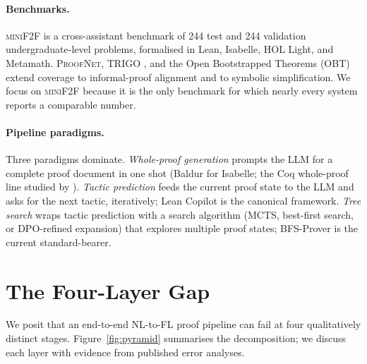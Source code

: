 \documentclass[11pt,letterpaper]{article}
\begin{document}
\paragraph{Benchmarks.}
\textsc{miniF2F} is a cross-assistant benchmark of 244 test and 244
validation undergraduate-level problems, formalised in Lean,
Isabelle, HOL Light, and Metamath. \textsc{ProofNet}, \textsc{TRIGO}
\cite{xiong2023trigo}, and the Open Bootstrapped Theorems (OBT)
\cite{wang2024theoremllama} extend coverage to informal-proof
alignment and to symbolic simplification. We focus on \textsc{miniF2F}
because it is the only benchmark for which nearly every system reports
a comparable number.

\paragraph{Pipeline paradigms.}
Three paradigms dominate. \emph{Whole-proof generation} prompts the
LLM for a complete proof document in one shot (Baldur for Isabelle;
the Coq whole-proof line studied by \cite{prasad2024coq}).
\emph{Tactic prediction} feeds the current proof state to the LLM and
asks for the next tactic, iteratively; Lean Copilot
\cite{song2024leancopilot} is the canonical framework. \emph{Tree
search} wraps tactic prediction with a search algorithm (MCTS,
best-first search, or DPO-refined expansion) that explores multiple
proof states; BFS-Prover \cite{xin2025bfsprover} is the current
standard-bearer.

\section{The Four-Layer Gap}
\label{sec:layers}

We posit that an end-to-end NL-to-FL proof pipeline can fail at four
qualitatively distinct stages. Figure~\ref{fig:pyramid} summarises the
decomposition; we discuss each layer with evidence from published
error analyses.
\end{document}
